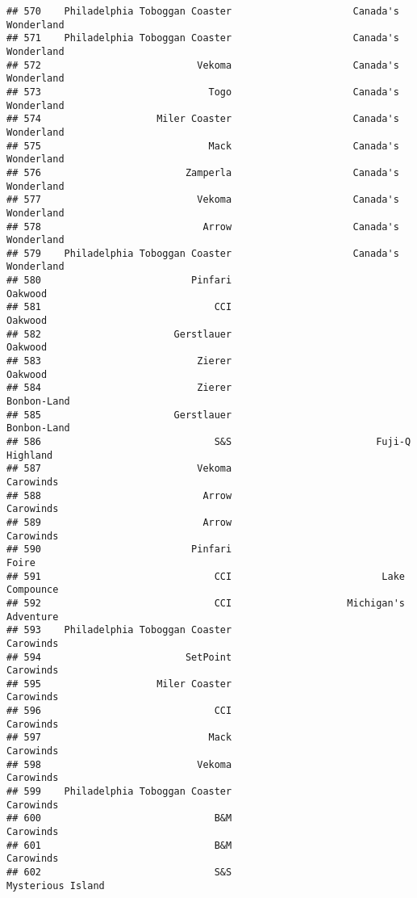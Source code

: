 \documentclass[
]{article}
\begin{document}
\begin{verbatim}
## 570    Philadelphia Toboggan Coaster                     Canada's Wonderland
## 571    Philadelphia Toboggan Coaster                     Canada's Wonderland
## 572                           Vekoma                     Canada's Wonderland
## 573                             Togo                     Canada's Wonderland
## 574                    Miler Coaster                     Canada's Wonderland
## 575                             Mack                     Canada's Wonderland
## 576                         Zamperla                     Canada's Wonderland
## 577                           Vekoma                     Canada's Wonderland
## 578                            Arrow                     Canada's Wonderland
## 579    Philadelphia Toboggan Coaster                     Canada's Wonderland
## 580                          Pinfari                                 Oakwood
## 581                              CCI                                 Oakwood
## 582                       Gerstlauer                                 Oakwood
## 583                           Zierer                                 Oakwood
## 584                           Zierer                             Bonbon-Land
## 585                       Gerstlauer                             Bonbon-Land
## 586                              S&S                         Fuji-Q Highland
## 587                           Vekoma                               Carowinds
## 588                            Arrow                               Carowinds
## 589                            Arrow                               Carowinds
## 590                          Pinfari                                   Foire
## 591                              CCI                          Lake Compounce
## 592                              CCI                    Michigan's Adventure
## 593    Philadelphia Toboggan Coaster                               Carowinds
## 594                         SetPoint                               Carowinds
## 595                    Miler Coaster                               Carowinds
## 596                              CCI                               Carowinds
## 597                             Mack                               Carowinds
## 598                           Vekoma                               Carowinds
## 599    Philadelphia Toboggan Coaster                               Carowinds
## 600                              B&M                               Carowinds
## 601                              B&M                               Carowinds
## 602                              S&S                       Mysterious Island

\end{verbatim}
\end{document}
